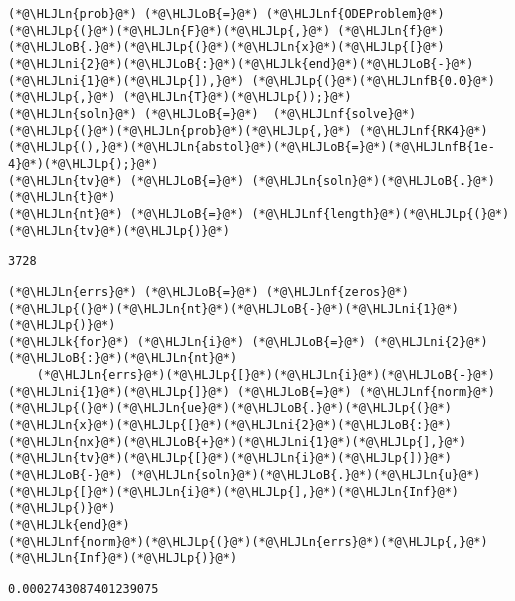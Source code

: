 \documentclass[12pt,landscape]{article}
\newcommand{\HLJLk}[1]{\textcolor[RGB]{148,91,176}{\textbf{#1}}}
\newcommand{\HLJLn}[1]{#1}
\newcommand{\HLJLnf}[1]{\textcolor[RGB]{66,102,213}{#1}}
\newcommand{\HLJLnfB}[1]{\textcolor[RGB]{59,151,46}{#1}}
\newcommand{\HLJLni}[1]{\textcolor[RGB]{59,151,46}{#1}}
\newcommand{\HLJLoB}[1]{\textcolor[RGB]{102,102,102}{\textbf{#1}}}
\newcommand{\HLJLp}[1]{#1}
\begin{document}
{\begin{lstlisting}
(*@\HLJLn{prob}@*) (*@\HLJLoB{=}@*) (*@\HLJLnf{ODEProblem}@*)(*@\HLJLp{(}@*)(*@\HLJLn{F}@*)(*@\HLJLp{,}@*) (*@\HLJLn{f}@*)(*@\HLJLoB{.}@*)(*@\HLJLp{(}@*)(*@\HLJLn{x}@*)(*@\HLJLp{[}@*)(*@\HLJLni{2}@*)(*@\HLJLoB{:}@*)(*@\HLJLk{end}@*)(*@\HLJLoB{-}@*)(*@\HLJLni{1}@*)(*@\HLJLp{]),}@*) (*@\HLJLp{(}@*)(*@\HLJLnfB{0.0}@*)(*@\HLJLp{,}@*) (*@\HLJLn{T}@*)(*@\HLJLp{));}@*)
(*@\HLJLn{soln}@*) (*@\HLJLoB{=}@*)  (*@\HLJLnf{solve}@*)(*@\HLJLp{(}@*)(*@\HLJLn{prob}@*)(*@\HLJLp{,}@*) (*@\HLJLnf{RK4}@*)(*@\HLJLp{(),}@*)(*@\HLJLn{abstol}@*)(*@\HLJLoB{=}@*)(*@\HLJLnfB{1e-4}@*)(*@\HLJLp{);}@*)
(*@\HLJLn{tv}@*) (*@\HLJLoB{=}@*) (*@\HLJLn{soln}@*)(*@\HLJLoB{.}@*)(*@\HLJLn{t}@*)
(*@\HLJLn{nt}@*) (*@\HLJLoB{=}@*) (*@\HLJLnf{length}@*)(*@\HLJLp{(}@*)(*@\HLJLn{tv}@*)(*@\HLJLp{)}@*)
\end{lstlisting}

\begin{lstlisting}
3728
\end{lstlisting}


\begin{lstlisting}
(*@\HLJLn{errs}@*) (*@\HLJLoB{=}@*) (*@\HLJLnf{zeros}@*)(*@\HLJLp{(}@*)(*@\HLJLn{nt}@*)(*@\HLJLoB{-}@*)(*@\HLJLni{1}@*)(*@\HLJLp{)}@*)
(*@\HLJLk{for}@*) (*@\HLJLn{i}@*) (*@\HLJLoB{=}@*) (*@\HLJLni{2}@*)(*@\HLJLoB{:}@*)(*@\HLJLn{nt}@*)
    (*@\HLJLn{errs}@*)(*@\HLJLp{[}@*)(*@\HLJLn{i}@*)(*@\HLJLoB{-}@*)(*@\HLJLni{1}@*)(*@\HLJLp{]}@*) (*@\HLJLoB{=}@*) (*@\HLJLnf{norm}@*)(*@\HLJLp{(}@*)(*@\HLJLn{ue}@*)(*@\HLJLoB{.}@*)(*@\HLJLp{(}@*)(*@\HLJLn{x}@*)(*@\HLJLp{[}@*)(*@\HLJLni{2}@*)(*@\HLJLoB{:}@*)(*@\HLJLn{nx}@*)(*@\HLJLoB{+}@*)(*@\HLJLni{1}@*)(*@\HLJLp{],}@*)(*@\HLJLn{tv}@*)(*@\HLJLp{[}@*)(*@\HLJLn{i}@*)(*@\HLJLp{])}@*) (*@\HLJLoB{-}@*) (*@\HLJLn{soln}@*)(*@\HLJLoB{.}@*)(*@\HLJLn{u}@*)(*@\HLJLp{[}@*)(*@\HLJLn{i}@*)(*@\HLJLp{],}@*)(*@\HLJLn{Inf}@*)(*@\HLJLp{)}@*)
(*@\HLJLk{end}@*)
(*@\HLJLnf{norm}@*)(*@\HLJLp{(}@*)(*@\HLJLn{errs}@*)(*@\HLJLp{,}@*)(*@\HLJLn{Inf}@*)(*@\HLJLp{)}@*)
\end{lstlisting}

\begin{lstlisting}
0.0002743087401239075
\end{lstlisting}


}
\end{document}
